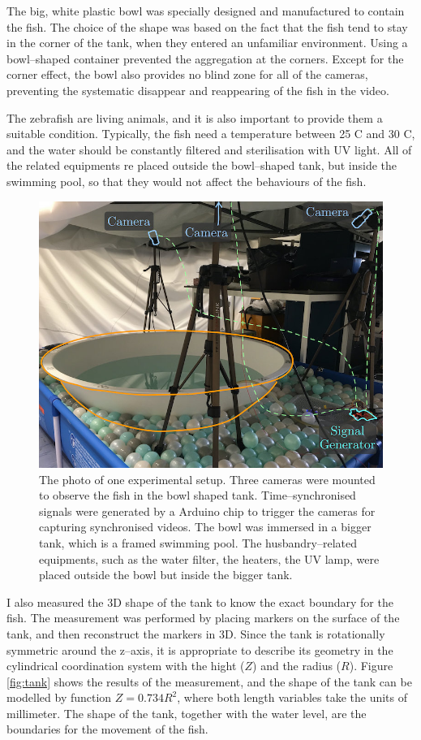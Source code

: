 \documentclass[11pt,twoside]{report}
\begin{document}
The big, white plastic bowl was specially designed and manufactured to contain the fish. The choice of the shape was based on the fact that the fish tend to stay in the corner of the tank, when they entered an unfamiliar environment. Using a bowl--shaped container prevented the aggregation at the corners. Except for the corner effect, the bowl also provides no blind zone for all of the cameras, preventing the systematic disappear and reappearing of the fish in the video.


The zebrafish are living animals, and it is also important to provide them a suitable condition. Typically, the fish need a temperature between 25 \degree C and 30 \degree C, and the water should be constantly filtered and sterilisation with UV light. All of the related equipments re placed outside the bowl--shaped tank, but inside the swimming pool, so that they would not affect the behaviours of the fish.


\begin{figure}
  \includegraphics[width=0.8\linewidth,outer]{lab.jpg}
  \caption{The photo of one experimental setup. Three cameras were mounted to observe the fish in the bowl shaped tank. Time--synchronised signals were generated by a Arduino chip to trigger the cameras for capturing synchronised videos. The bowl was immersed in a bigger tank, which is a framed swimming pool. The husbandry--related equipments, such as the water filter, the heaters, the UV lamp, were placed outside the bowl but inside the bigger tank.}
  \label{fig:lab}
\end{figure}


I also measured the 3D shape of the tank to know the exact boundary for the fish. The measurement was performed by placing markers on the surface of the tank, and then reconstruct the markers in 3D. Since the tank is rotationally symmetric around the z--axis, it is appropriate to describe its geometry in the cylindrical coordination system with the hight ($Z$) and the radius ($R$). Figure \ref{fig:tank} shows the results of the measurement, and the shape of the tank can be modelled by function $Z=0.734 R^2$, where both length variables take the units of millimeter. The shape of the tank, together with the water level, are the boundaries for the movement of the fish.
\end{document}
